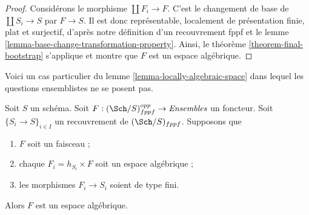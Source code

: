 \begin{proof}
Considérons le morphisme $\coprod F_i \to F$. C'est le changement de base
de $\coprod S_i \to S$ par $F \to S$. Il est donc représentable,
localement de présentation finie, plat et surjectif, d'après notre définition
d'un recouvrement fppf et le
lemme \ref{lemma-base-change-transformation-property}.
Ainsi, le
théorème \ref{theorem-final-bootstrap}
s'applique et montre que $F$ est un espace algébrique.
\end{proof}

\noindent
Voici un cas particulier du lemme \ref{lemma-locally-algebraic-space}
dans lequel les questions ensemblistes ne se posent pas.

\begin{lemma}
\label{lemma-locally-algebraic-space-finite-type}
Soit $S$ un schéma.
Soit $F : (\Sch/S)_{fppf}^{opp} \to \textit{Ensembles}$ un foncteur.
Soit $\{S_i \to S\}_{i \in I}$ un recouvrement de $(\Sch/S)_{fppf}$.
Supposons que
\begin{enumerate}
\item $F$ soit un faisceau ;
\item chaque $F_i = h_{S_i} \times F$ soit un espace algébrique ;
\item les morphismes $F_i \to S_i$ soient de type fini.
\end{enumerate}
Alors $F$ est un espace algébrique.
\end{lemma}

